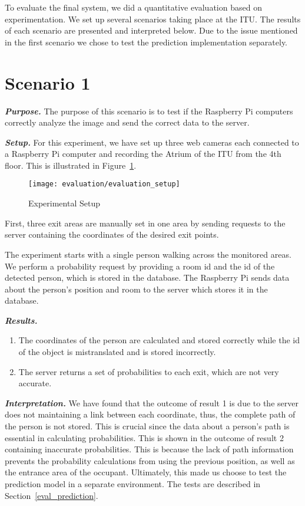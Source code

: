 To evaluate the final system, we did a quantitative evaluation based on experimentation. We set up several scenarios taking place at the ITU. The results of each scenario are presented and interpreted below. Due to the issue mentioned in the first scenario we chose to test the prediction implementation separately.

\section{Scenario 1}
\label{sec:scen1}
\textit{\textbf{Purpose.}} The purpose of this scenario is to test if the Raspberry Pi computers correctly analyze the image and send the correct data to the server.

\textit{\textbf{Setup.}} For this experiment, we have set up three web cameras each connected to a Raspberry Pi computer and recording the Atrium of the ITU from the 4th floor. This is illustrated in Figure~\ref{fig:evaluation_setup}.

\begin{figure}[htb]
	\centering
	\texttt{[image: evaluation/evaluation\_setup]}
	\caption{Experimental Setup}
	\label{fig:evaluation_setup}
\end{figure}

First, three exit areas are manually set in one area by sending requests to the server containing the coordinates of the desired exit points. 

The experiment starts with a single person walking across the monitored areas. We perform a probability request by providing a room id and the id of the detected person, which is stored in the database. The Raspberry Pi sends data about the person's position and room to the server which stores it in the database.

\textit{\textbf{Results.}}
\begin{enumerate}
\item The coordinates of the person are calculated and stored correctly while the id of the object is mistranslated and is stored incorrectly. 
\item The server returns a set of probabilities to each exit, which are not very accurate.
\end{enumerate}

\textit{\textbf{Interpretation.}} 
We have found that the outcome of result 1 is due to the server does not maintaining a link between each coordinate, thus, the complete path of the person is not stored.
This is crucial since the data about a person's path is essential in calculating probabilities. This is shown in the outcome of result 2 containing inaccurate probabilities. This is because the lack of path information prevents the probability calculations from using the previous position, as well as the entrance area of the occupant. Ultimately, this made us choose to test the prediction model in a separate environment. The tests are described in Section~\ref{eval_prediction}.

